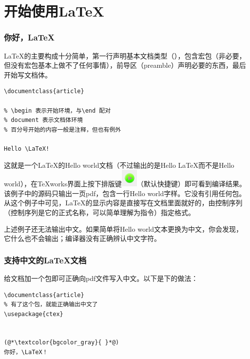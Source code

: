 
\part{开始使用\LaTeX}

\section{你好，\LaTeX}

\LaTeX 的主要构成十分简单，第一行声明基本文档类型（），包含宏包（非必要，但没有宏包基本上做不了任何事情），前导区（preamble）声明必要的东西，最后开始写文档体。

\begin{lstlisting}[style = LaTeX_TeXworks, caption = Hello \LaTeX]
\documentclass{article}

% \begin 表示开始环境，与\end 配对
% document 表示文档体环境
% 百分号开始的内容一般是注释，但也有例外

Hello \LaTeX!

\end{lstlisting}

这就是一个\LaTeX 的Hello world文档（不过输出的是Hello \LaTeX 而不是Hello world），在TeXworks界面上按下排版键\includegraphics{contents/assets/img/typeset_key.png}（默认快捷键）即可看到编译结果。该例子中的源码只输出一页pdf，包含一行Hello world字样。它没有引用任何包。从这个例子中可见，\LaTeX 的显示内容是直接写在文档里面就好的，由控制序列（控制序列是它的正式名称，可以简单理解为指令）指定格式。

上述例子还无法输出中文。如果简单将Hello world文本更换为中文，你会发现，它什么也不会输出；编译器没有正确辨认中文字符。

\section{支持中文的\LaTeX 文档}

给文档加一个包即可正确向pdf文件写入中文。以下是\XeLaTeX 下的做法：

\begin{lstlisting}[style = LaTeX_TeXworks, caption = 你好，中文\LaTeX - \XeLaTeX]
\documentclass{article}
% 有了这个包，就能正确输出中文了
\usepackage{ctex}


(@*\textcolor{bgcolor_gray}{ }*@)
你好，\LaTeX！

\end{lstlisting}

